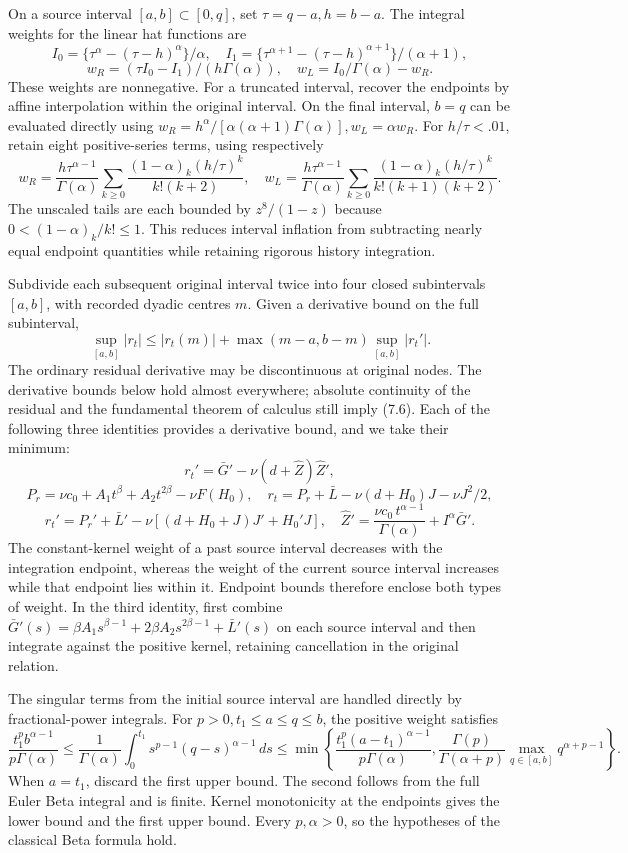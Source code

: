 \documentclass[a4paper,11pt]{article}
\begin{document}
On a source interval \([a,b]\subset[0,q]\), set \(\tau=q-a,h=b-a\). The integral weights for the linear hat functions are
\[
I_0=\{\tau^\alpha-(\tau-h)^\alpha\}/\alpha,\quad
I_1=\{\tau^{\alpha+1}-(\tau-h)^{\alpha+1}\}/(\alpha+1),
\]
\[
w_R=(\tau I_0-I_1)/(h\Gamma(\alpha)),\quad
w_L=I_0/\Gamma(\alpha)-w_R.
\tag{7.4}
\]
These weights are nonnegative. For a truncated interval, recover the endpoints by affine interpolation within the original interval. On the final interval, \(b=q\) can be evaluated directly using
\(w_R=h^\alpha/[\alpha(\alpha+1)\Gamma(\alpha)],w_L=\alpha w_R\).
For \(h/\tau<.01\), retain eight positive-series terms, using respectively
\[
w_R=\frac{h\tau^{\alpha-1}}{\Gamma(\alpha)}
\sum_{k\ge0}\frac{(1-\alpha)_k(h/\tau)^k}{k!(k+2)},\quad
w_L=\frac{h\tau^{\alpha-1}}{\Gamma(\alpha)}
\sum_{k\ge0}\frac{(1-\alpha)_k(h/\tau)^k}{k!(k+1)(k+2)}.
\tag{7.5}
\]
The unscaled tails are each bounded by \(z^8/(1-z)\) because \(0<(1-\alpha)_k/k!\le1\). This reduces interval inflation from subtracting nearly equal endpoint quantities while retaining rigorous history integration.

Subdivide each subsequent original interval twice into four closed subintervals \([a,b]\), with recorded dyadic centres \(m\). Given a derivative bound on the full subinterval,
\[
\sup_{[a,b]}|r_t|\le|r_t(m)|+\max(m-a,b-m)\sup_{[a,b]}|r_t'|.
\tag{7.6}
\]
The ordinary residual derivative may be discontinuous at original nodes. The derivative bounds below hold almost everywhere; absolute continuity of the residual and the fundamental theorem of calculus still imply (7.6). Each of the following three identities provides a derivative bound, and we take their minimum:
\[
r_t'=\bar G'-\nu(d+\widehat Z)\widehat Z',
\]
\[
P_r=\nu c_0+A_1t^\beta+A_2t^{2\beta}-\nu F(H_0),\quad
r_t=P_r+\bar L-\nu(d+H_0)J-\nu J^2/2,
\]
\[
r_t'=P_r'+\bar L'-\nu[(d+H_0+J)J'+H_0'J],
\quad
\widehat Z'=\frac{\nu c_0\,t^{\alpha-1}}{\Gamma(\alpha)}+I^\alpha\bar G'.
\tag{7.7}
\]
The constant-kernel weight of a past source interval decreases with the integration endpoint, whereas the weight of the current source interval increases while that endpoint lies within it. Endpoint bounds therefore enclose both types of weight. In the third identity, first combine
\(\bar G'(s)=\beta A_1s^{\beta-1}+2\beta A_2s^{2\beta-1}+\bar L'(s)\) on each source interval and then integrate against the positive kernel, retaining cancellation in the original relation.

The singular terms from the initial source interval are handled directly by fractional-power integrals. For \(p>0,t_1\le a\le q\le b\), the positive weight satisfies
\[
\frac{t_1^pb^{\alpha-1}}{p\Gamma(\alpha)}
\le\frac1{\Gamma(\alpha)}\int_0^{t_1}s^{p-1}(q-s)^{\alpha-1}\,ds
\le\min\left\{
\frac{t_1^p(a-t_1)^{\alpha-1}}{p\Gamma(\alpha)},
\frac{\Gamma(p)}{\Gamma(\alpha+p)}
 \max_{q\in[a,b]}q^{\alpha+p-1}\right\}.
\tag{7.8}
\]
When \(a=t_1\), discard the first upper bound. The second follows from the full Euler Beta integral and is finite. Kernel monotonicity at the endpoints gives the lower bound and the first upper bound. Every \(p,\alpha>0\), so the hypotheses of the classical Beta formula hold.
\end{document}
